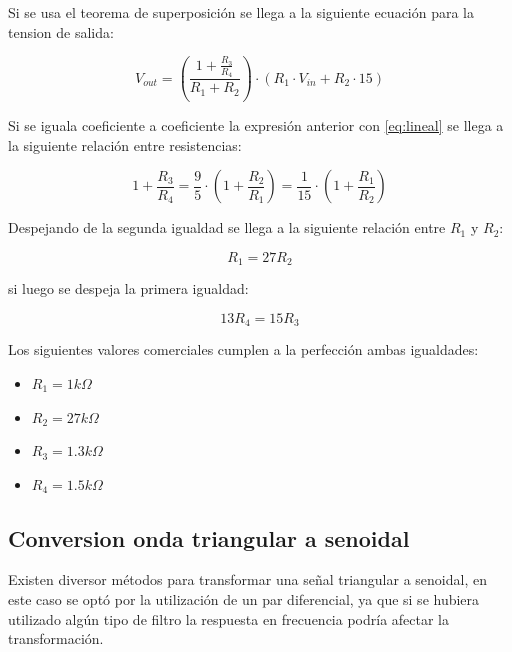 Si se usa el teorema de superposición se llega a la siguiente ecuación para la tension de salida:

\begin{equation}
V_{out} = (\frac{1 + \frac{R_3}{R_4}}{R_1 + R_2})\cdot (R_1\cdot V_{in} + R_2\cdot 15)
\end{equation}

Si se iguala coeficiente a coeficiente la expresión anterior con \ref{eq:lineal} se llega a la siguiente relación entre resistencias:

\begin{equation}
1 + \frac{R_3}{R_4} = \frac{9}{5} \cdot (1 + \frac{R_2}{R_1}) =\frac{1}{15} \cdot (1 + \frac{R_1}{R_2})
\end{equation}

Despejando de la segunda igualdad se llega a la siguiente relación entre $R_1$ y $R_2$:

\begin{equation}
R_1 = 27R_2
\end{equation}

si luego se despeja la primera igualdad:

\begin{equation}
13R_4 = 15R_3
\end{equation}

Los siguientes valores comerciales cumplen a la perfección ambas igualdades:

\begin{itemize}
\item $R_1 = 1k\Omega$
\item $R_2 = 27k\Omega$
\item $R_3 = 1.3k\Omega$
\item $R_4 = 1.5k\Omega$
\end{itemize}

\newpage

\subsection{Conversion onda triangular a senoidal}
Existen diversor métodos para transformar una señal triangular a senoidal, en este caso se optó por la utilización de un par diferencial, ya que si se hubiera utilizado algún tipo de filtro la respuesta en frecuencia podría afectar la transformación. 


